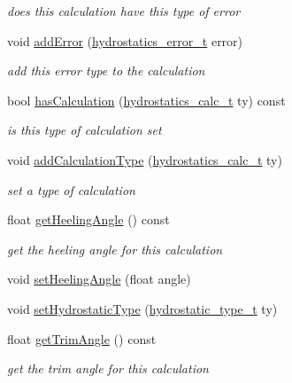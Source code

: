 \begin{DoxyCompactItemize}
\begin{DoxyCompactList}\small\item\em does this calculation have this type of error \end{DoxyCompactList}\item 
void \hyperlink{classShipCAD_1_1HydrostaticCalc_ad6415cb7c8e13ded4537292dd3a06688}{add\-Error} (\hyperlink{namespaceShipCAD_a1d801b982c24bce0cf10ffd4b995dda0}{hydrostatics\-\_\-error\-\_\-t} error)
\begin{DoxyCompactList}\small\item\em add this error type to the calculation \end{DoxyCompactList}\item 
bool \hyperlink{classShipCAD_1_1HydrostaticCalc_adb8e8e29d28e2da0e75e30c0636f034b}{has\-Calculation} (\hyperlink{namespaceShipCAD_ac9ff7fc96a52fceafa83edc0d5d06fce}{hydrostatics\-\_\-calc\-\_\-t} ty) const 
\begin{DoxyCompactList}\small\item\em is this type of calculation set \end{DoxyCompactList}\item 
void \hyperlink{classShipCAD_1_1HydrostaticCalc_a32379831790fd88d422c6783b1b70ef7}{add\-Calculation\-Type} (\hyperlink{namespaceShipCAD_ac9ff7fc96a52fceafa83edc0d5d06fce}{hydrostatics\-\_\-calc\-\_\-t} ty)
\begin{DoxyCompactList}\small\item\em set a type of calculation \end{DoxyCompactList}\item 
float \hyperlink{classShipCAD_1_1HydrostaticCalc_a7b27fef68486f663fd325ef316032a03}{get\-Heeling\-Angle} () const 
\begin{DoxyCompactList}\small\item\em get the heeling angle for this calculation \end{DoxyCompactList}\item 
void \hyperlink{classShipCAD_1_1HydrostaticCalc_ae6bf118e2e5e89a8e8d7ea7675fdee22}{set\-Heeling\-Angle} (float angle)
\item 
void \hyperlink{classShipCAD_1_1HydrostaticCalc_a61df8d7421f2900cbc18a6565963c66e}{set\-Hydrostatic\-Type} (\hyperlink{namespaceShipCAD_afea51c7ee52940acebde29bf44206fe2}{hydrostatic\-\_\-type\-\_\-t} ty)
\item 
float \hyperlink{classShipCAD_1_1HydrostaticCalc_aecd19708f7ebadb4321af93565ffc184}{get\-Trim\-Angle} () const 
\begin{DoxyCompactList}\small\item\em get the trim angle for this calculation \end{DoxyCompactList}\item 

\end{DoxyCompactItemize}
